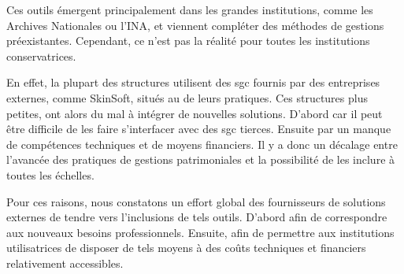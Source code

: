 Ces outils émergent principalement dans les grandes institutions, comme les Archives Nationales ou l'INA, et viennent compléter des méthodes de gestions préexistantes. Cependant, ce n'est pas la réalité pour toutes les institutions conservatrices. 

En effet, la plupart des structures utilisent des \gls{sgc} fournis par des entreprises externes, comme SkinSoft, situés au \coeur de leurs pratiques. Ces structures plus petites, ont alors du mal à intégrer de nouvelles solutions. D'abord car il peut être difficile de les faire s'interfacer avec des \gls{sgc} tierces. Ensuite par un manque de compétences techniques et de moyens financiers. Il y a donc un décalage entre l'avancée des pratiques de gestions patrimoniales et la possibilité de les inclure à toutes les échelles. 

Pour ces raisons, nous constatons un effort global des fournisseurs de solutions externes de tendre vers l'inclusions de tels outils. D'abord afin de correspondre aux nouveaux besoins professionnels. Ensuite, afin de permettre aux institutions utilisatrices de disposer de tels moyens à des coûts techniques et financiers relativement accessibles.
